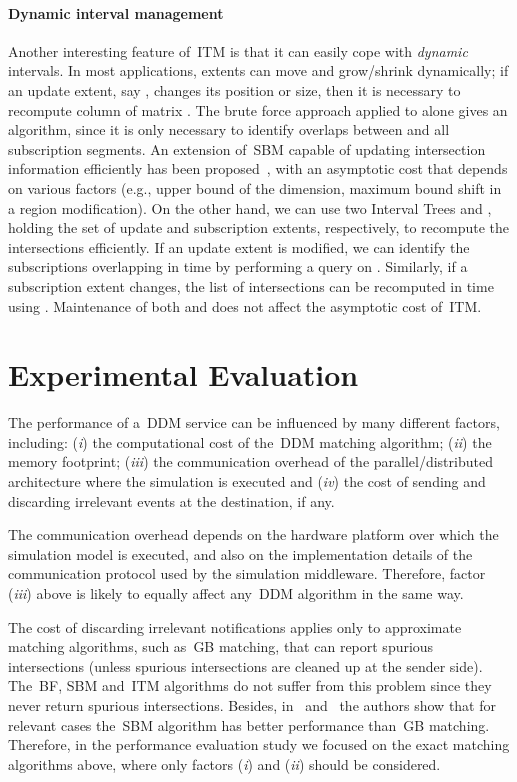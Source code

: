 \documentclass[10pt, conference, compsocconf]{IEEEtran}
\begin{document}
\paragraph*{Dynamic interval management} 
Another interesting feature of~\ac{ITM} is that it can easily cope
with \emph{dynamic} intervals. In most applications, extents can move
and grow/shrink dynamically; if an update extent, say , changes
its position or size, then it is necessary to recompute column  of
matrix . The brute force approach applied to  alone
gives an  algorithm, since it is only necessary to identify
overlaps between  and all  subscription segments. An extension
of~\ac{SBM} capable of updating intersection information efficiently
has been proposed~\cite{Pan2011}, with an asymptotic cost that depends
on various factors (e.g., upper bound of the dimension, maximum bound
shift in a region modification). On the other hand, we can use two
Interval Trees  and , holding the set of update and
subscription extents, respectively, to recompute the intersections
efficiently. If an update extent  is modified, we can identify
the subscriptions overlapping  in time  by performing a query on . Similarly, if a
subscription extent  changes, the list of intersections can be
recomputed in time  using
. Maintenance of both  and  does not affect the
asymptotic cost of~\ac{ITM}.


\section{Experimental Evaluation}\label{sec:experimental-evaluation}

The performance of a~\ac{DDM} service can be influenced by many
different factors, including: (\emph{i}) the computational cost of
the~\ac{DDM} matching algorithm; (\emph{ii}) the memory footprint;
(\emph{iii}) the communication overhead of the parallel/distributed
architecture where the simulation is executed and (\emph{iv}) the
cost of sending and discarding irrelevant events at the destination,
if any.

The communication overhead depends on the hardware platform over which
the simulation model is executed, and also on the implementation
details of the communication protocol used by the simulation
middleware. Therefore, factor (\emph{iii}) above is likely to equally
affect any~\ac{DDM} algorithm in the same way.

The cost of discarding irrelevant notifications applies only to
approximate matching algorithms, such as~\ac{GB} matching, that can
report spurious intersections (unless spurious intersections are
cleaned up at the sender side). The~\ac{BF}, \ac{SBM} and~\ac{ITM}
algorithms do not suffer from this problem since they never return
spurious intersections. Besides, in~\cite{Raczy2005}
and~\cite{6147978} the authors show that for relevant cases
the~\ac{SBM} algorithm has better performance than~\ac{GB} matching.
Therefore, in the performance evaluation study we focused on the exact
matching algorithms above, where only factors (\emph{i}) and
(\emph{ii}) should be considered.
\end{document}
